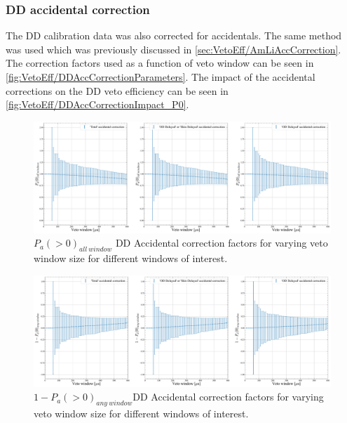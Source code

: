 \subsubsection{DD accidental correction}
The DD calibration data was also corrected for accidentals. The same method was used which was previously discussed in \autoref{sec:VetoEff/AmLiAccCorrection}. The correction factors used as a function of veto window can be seen in \autoref{fig:VetoEff/DDAccCorrectionParameters}.
The impact of the accidental corrections on the DD veto efficiency can be seen in \autoref{fig:VetoEff/DDAccCorrectionImpact_P0}.

\begin{figure}[!ht]
	\centering
	\includegraphics[width=\textwidth]{figures/VetoEfficiency/DDAccCorrectionImpact_P0.pdf}
	\caption{$P_a(>0)_{all\:window}$ DD Accidental correction factors for varying veto window size for different windows of interest.}
	\label{fig:VetoEff/DDAccCorrectionImpact_P0}
\end{figure}

\begin{figure}[!ht]
	\centering
	\includegraphics[width=\textwidth]{figures/VetoEfficiency/DDAccCorrectionImpact_1-P0.pdf}
	\caption{$1-P_a(>0)_{any\:window}$DD Accidental correction factors for varying veto window size for different windows of interest.}
	\label{fig:VetoEff/DDAccCorrectionImpact_1-P0}
\end{figure}

